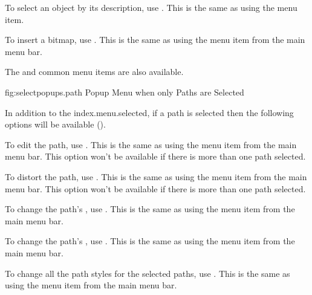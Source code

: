 
To select an \gls{object} by its description, use
. This is the same as using the
 menu item.


To insert a \gls{bitmap}, use . This
is the same as using the  menu item from the main menu bar.

The  and  common menu
items are also available.



\FloatFig
  {fig:selectpopups.path}
  {}
  {Popup Menu when only Paths are Selected}

In addition to the \gls{index.menu.selected},
if a path is selected then the following options will be available
().


To edit the path, use . This is the same as using
the  menu item from the main menu bar.
This option won't be available if there is more than one
path selected.


To distort the path, use . This is the same as using
the  menu item from the main menu bar.
This option won't be available if there is more than one
path selected.


To change the path's , use
. This is the same as using the
 menu item from the main menu bar.


To change the path's , use
. This is the same as using the
 menu item from the main menu bar.


To change all the path styles for the selected paths,
use . This is the same as using the
 menu item from the main menu bar.

